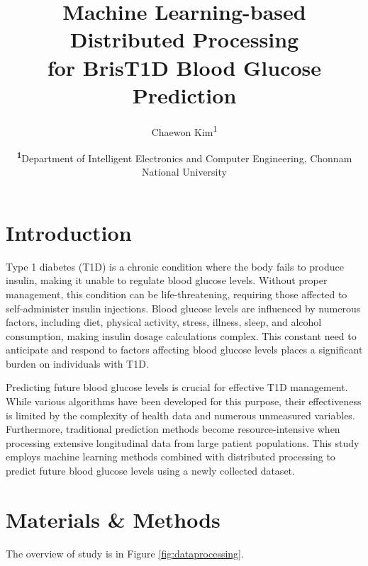 \documentclass[
	a4paper, %
	10pt, %
	unnumberedsections, %
	twoside, %
]{LTJournalArticle}
\title{Machine Learning-based Distributed Processing \\ for BrisT1D Blood Glucose Prediction} %
\author{%
	Chaewon Kim\textsuperscript{1}}
\date{\footnotesize\textsuperscript{\textbf{1}}Department of Intelligent Electronics and Computer Engineering, Chonnam National University}
\begin{document}
\maketitle %


\section{Introduction}

Type 1 diabetes (T1D) is a chronic condition where the body fails to produce insulin, making it unable to regulate blood glucose levels. Without proper management, this condition can be life-threatening, requiring those affected to self-administer insulin injections. Blood glucose levels are influenced by numerous factors, including diet, physical activity, stress, illness, sleep, and alcohol consumption, making insulin dosage calculations complex. This constant need to anticipate and respond to factors affecting blood glucose levels places a significant burden on individuals with T1D.

Predicting future blood glucose levels is crucial for effective T1D management. While various algorithms have been developed for this purpose, their effectiveness is limited by the complexity of health data and numerous unmeasured variables. Furthermore, traditional prediction methods become resource-intensive when processing extensive longitudinal data from large patient populations. This study employs machine learning methods combined with distributed processing to predict future blood glucose levels using a newly collected dataset.




\section{Materials \& Methods}


The overview of study is in Figure \ref{fig:dataprocessing}.
\end{document}
